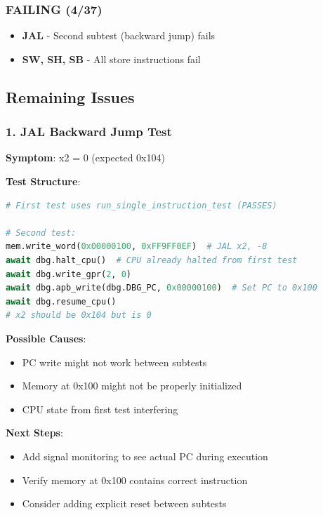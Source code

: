 \subsubsection{\texorpdfstring{FAILING (4/37) \bad{}}{FAILING (4/37) }}\label{cr:fix:test-fix-summary:failing-437-x}

\begin{record}

\begin{itemize}
\tightlist
\item
  \textbf{JAL} - Second subtest (backward jump) fails
\item
  \textbf{SW, SH, SB} - All store instructions fail
\end{itemize}

\end{record}

\subsection{Remaining Issues}\label{cr:fix:test-fix-summary:remaining-issues}

\subsubsection{1. JAL Backward Jump Test}\label{cr:fix:test-fix-summary:1-jal-backward-jump-test}

\begin{record}

\textbf{Symptom}: x2 = 0 (expected 0x104)

\textbf{Test Structure}:

\begin{lstlisting}[language=Python]
# First test uses run_single_instruction_test (PASSES)

# Second test:
mem.write_word(0x00000100, 0xFF9FF0EF)  # JAL x2, -8
await dbg.halt_cpu()  # CPU already halted from first test
await dbg.write_gpr(2, 0)
await dbg.apb_write(dbg.DBG_PC, 0x00000100)  # Set PC to 0x100
await dbg.resume_cpu()
# x2 should be 0x104 but is 0
\end{lstlisting}

\textbf{Possible Causes}:

\begin{itemize}
\tightlist
\item
  PC write might not work between subtests
\item
  Memory at 0x100 might not be properly initialized
\item
  CPU state from first test interfering
\end{itemize}

\textbf{Next Steps}:

\begin{itemize}
\tightlist
\item
  Add signal monitoring to see actual PC during execution
\item
  Verify memory at 0x100 contains correct instruction
\item
  Consider adding explicit reset between subtests
\end{itemize}

\end{record}


